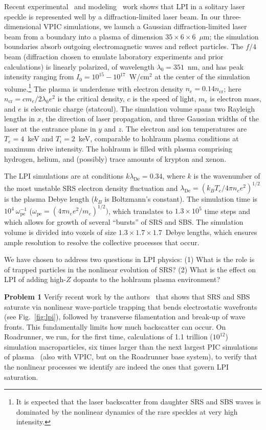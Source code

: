 \documentclass[10pt]{article}
\newcommand{\lde}      {\lambda_{\mathrm{De}}}
\newcommand{\wpe}      {\omega_{\mathrm{pe}}}
\begin{document}
Recent experimental~\cite{Kline_PRL_2005} and
modeling~\cite{Yin_et_al_PRL_2007_SRS} work shows that LPI in a
solitary laser speckle is represented well by a diffraction-limited
laser beam.  In our three-dimensional VPIC simulations, we launch a
Gaussian diffraction-limited laser beam from a boundary into a plasma
of dimension $35 \times 6 \times 6$~$\mu$m; the simulation boundaries
absorb outgoing electromagnetic waves and reflect particles.  The
$f/4$ beam (diffraction chosen to emulate laboratory experiments and
prior calculations) is linearly polarized, of wavelength
$\lambda_0 = 351$~nm, and has peak intensity ranging from $I_0 =
10^{15} - 10^{17}$~W/cm$^2$ at the center of the simulation volume.\footnote{It 
is expected that the laser backscatter from daughter SRS and SBS waves 
is dominated by the nonlinear dynamics of the rare speckles at very 
high intensity.}
The plasma is underdense with electron density $n_e = 0.14
n_{\mathrm{cr}}$; here $n_{\mathrm{cr}} = c m_e / 2 \lambda_0 e^2$ is
the critical density, $c$ is the speed of light, $m_e$ is electron
mass, and $e$ is electronic charge (statcoul).  The simulation volume 
spans two Rayleigh lengths in $x$, the direction
of laser propagation, and three Gaussian widths of the laser
at the entrance plane in $y$ and $z$.  The electron and ion
temperatures are $T_e = 4$~keV and $T_i = 2$~keV, comparable to hohlraum
plasma conditions at maximum drive intensity.  The
hohlraum is filled with plasma comprising hydrogen, helium, and
(possibly) trace amounts of krypton and xenon.

The LPI simulations are at conditions $k \lde = 0.34$, where $k$
is the wavenumber of the most unstable SRS electron density
fluctuation and $\lde = (k_B T_e / 4 \pi n_e e^2)^{1/2}$ is the plasma
Debye length ($k_B$ is Boltzmann's constant).  The simulation time is
$10^4~\wpe^{-1}$ ($\wpe = (4 \pi n_e e^2 / m_e)^{1/2})$, which
translates to $1.3 \times 10^5$ time steps and which allows for growth
of several ``bursts'' of SRS and SBS.  The simulation volume is
divided into voxels of size $1.3 \times 1.7 \times 1.7$~Debye
lengths, which ensures ample resolution to resolve the collective
processes that occur.

We have chosen to address two questions in LPI physics: (1) What is
the role is of trapped particles in the nonlinear evolution of SRS?
(2) What is the effect on LPI of adding high-$Z$ dopants to the
hohlraum plasma environment?

\textbf{Problem 1}
Verify recent work by the
authors~\cite{Yin_et_al_PRL_2007_SRS,Yin_et_al_Phys_Plasmas_2007_SRS}
that shows that SRS and SBS saturate via nonlinear wave-particle
trapping that bends electrostatic wavefronts (see Fig.~\ref{fig:lpi}), followed by transverse 
filamentation and break-up of wave fronts.  This fundamentally limits 
how much backscatter can occur. On Roadrunner, we run, for the first 
time, calculations of 1.1 trillion ($10^{12}$) simulation macroparticles,
six times larger than the next largest PIC simulations of
plasma~\cite{Yin_et_al_PRL_2007_reconnection} (also with VPIC, but on
the Roadrunner base system), to verify that the nonlinear processes we
identify are indeed the ones that govern LPI saturation.
\end{document}
